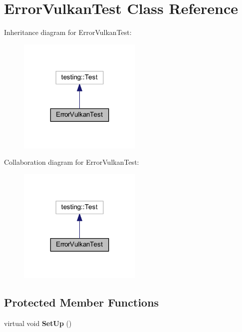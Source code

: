 \hypertarget{class_error_vulkan_test}{}\section{Error\+Vulkan\+Test Class Reference}
\label{class_error_vulkan_test}


Inheritance diagram for Error\+Vulkan\+Test\+:\nopagebreak
\begin{figure}[H]
\begin{center}
\leavevmode
\includegraphics[width=167pt]{class_error_vulkan_test__inherit__graph}
\end{center}
\end{figure}


Collaboration diagram for Error\+Vulkan\+Test\+:\nopagebreak
\begin{figure}[H]
\begin{center}
\leavevmode
\includegraphics[width=167pt]{class_error_vulkan_test__coll__graph}
\end{center}
\end{figure}
\subsection*{Protected Member Functions}
\begin{DoxyCompactItemize}
\item 
\hypertarget{class_error_vulkan_test_a5ae9d99b5e62289e47e4e7af7ab334ab}{}\label{class_error_vulkan_test_a5ae9d99b5e62289e47e4e7af7ab334ab} 
virtual void {\bfseries Set\+Up} ()
\end{DoxyCompactItemize}
